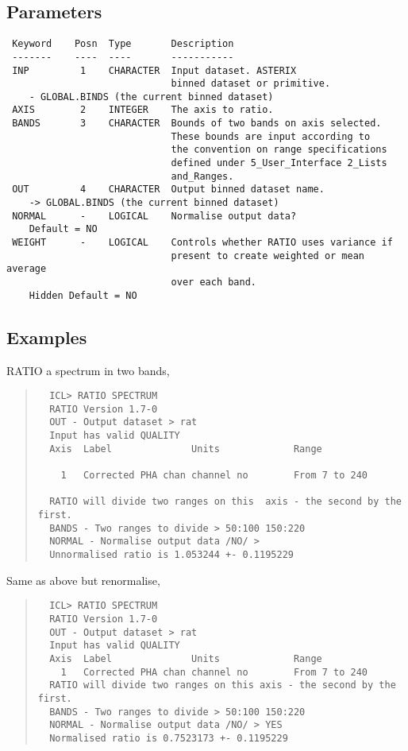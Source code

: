 \documentclass{book}
\renewcommand{\_}{{\tt\char'137}}     %
\begin{document}
\subsection{Parameters}
\begin{verbatim}
 Keyword    Posn  Type       Description
 -------    ----  ----       -----------
 INP         1    CHARACTER  Input dataset. ASTERIX
                             binned dataset or primitive.
    - GLOBAL.BINDS (the current binned dataset)
 AXIS        2    INTEGER    The axis to ratio.
 BANDS       3    CHARACTER  Bounds of two bands on axis selected.
                             These bounds are input according to
                             the convention on range specifications
                             defined under 5_User_Interface 2_Lists
                             and_Ranges.
 OUT         4    CHARACTER  Output binned dataset name.
    -> GLOBAL.BINDS (the current binned dataset)
 NORMAL      -    LOGICAL    Normalise output data?
    Default = NO
 WEIGHT      -    LOGICAL    Controls whether RATIO uses variance if
                             present to create weighted or mean average
                             over each band.
    Hidden Default = NO

\end{verbatim}\subsection{Examples}
RATIO a spectrum in two bands,

\begin{quote}\begin{verbatim}
  ICL> RATIO SPECTRUM
  RATIO Version 1.7-0
  OUT - Output dataset > rat
  Input has valid QUALITY
  Axis  Label              Units             Range

    1   Corrected PHA chan channel no        From 7 to 240

  RATIO will divide two ranges on this  axis - the second by the first.
  BANDS - Two ranges to divide > 50:100 150:220
  NORMAL - Normalise output data /NO/ >
  Unnormalised ratio is 1.053244 +- 0.1195229
\end{verbatim}\end{quote}
Same as above but renormalise,

\begin{quote}\begin{verbatim}
  ICL> RATIO SPECTRUM
  RATIO Version 1.7-0
  OUT - Output dataset > rat
  Input has valid QUALITY
  Axis  Label              Units             Range
    1   Corrected PHA chan channel no        From 7 to 240
  RATIO will divide two ranges on this axis - the second by the first.
  BANDS - Two ranges to divide > 50:100 150:220
  NORMAL - Normalise output data /NO/ > YES
  Normalised ratio is 0.7523173 +- 0.1195229
\end{verbatim}\end{quote}
\end{document}
